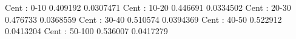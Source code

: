 Cent : 0-10
0.409192 0.0307471
Cent : 10-20
0.446691 0.0334502
Cent : 20-30
0.476733 0.0368559
Cent : 30-40
0.510574 0.0394369
Cent : 40-50
0.522912 0.0413204
Cent : 50-100
0.536007 0.0417279
